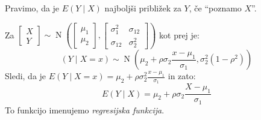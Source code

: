 \documentclass[12pt]{book}
\def\n{\noindent}
\theoremstyle{definition}
\theoremstyle{plain}
\theoremstyle{plain}
\theoremstyle{plain}
\theoremstyle{remark}
\begin{document}
\n Pravimo, da je $E(Y \mid X)$ najboljši približek za $Y$, če “poznamo $X$”. 

\begin{zgled}[nadaljevanje]
    Za $\begin{bmatrix}X \\ Y \end{bmatrix} \sim \operatorname{N}\left(\begin{bmatrix} \mu_1 \\\mu_2 \end{bmatrix}, \begin{bmatrix} \sigma_1^2 & \sigma_{12} \\ \sigma_{12} & \sigma_2^2\end{bmatrix}\right)$ kot prej je:
    $$
    (Y \mid X=x) \sim \operatorname{N}\left(\mu_2+\rho \sigma_2 \frac{x-\mu_1}{\sigma_1}, \sigma_2^2\left(1-\rho^2\right)\right)
    $$
    Sledi, da je $E(Y \mid X=x)=\mu_2+\rho \sigma_2^2 \frac{x-\mu_1}{\sigma_1}$ in zato: 
    $$
    E(Y \mid X)=\mu_2+\rho \sigma_2 \frac{X-\mu_1}{\sigma_1}
    $$
    To funkcijo imenujemo \emph{regresijska funkcija}.
\end{zgled}
\end{document}
